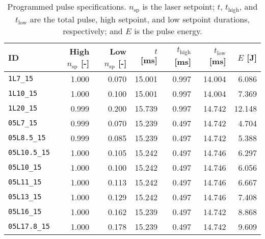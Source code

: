 \begin{table}[h]
\centering
\caption[Programmed pulse specifications]{Programmed pulse specifications. $n_\mathrm{sp}$ is the laser setpoint; $t$, $t_\mathrm{high}$, and $t_\mathrm{low}$ are the total pulse, high setpoint, and low setpoint durations, respectively; and $E$ is the pulse energy.}
\label{tab:app_pulseShapes}
\begin{tabular}{@{}lrrrrrr@{}}
\toprule
               ID & High $n_\mathrm{sp}$ [-] & Low $n_\mathrm{sp}$ [-] & $t$ [ms] & $t_\mathrm{high}$ [ms] & $t_\mathrm{low}$ [ms] & $E$ [J] \\
\midrule
    \verb|1L7_15| &                    1.000 &                   0.070 &   15.001 &                  0.997 &                14.004 &   6.086 \\
   \verb|1L10_15| &                    1.000 &                   0.100 &   15.001 &                  0.997 &                14.004 &   7.369 \\
   \verb|1L20_15| &                    0.999 &                   0.200 &   15.739 &                  0.997 &                14.742 &  12.148 \\
   \verb|05L7_15| &                    0.999 &                   0.070 &   15.239 &                  0.497 &                14.742 &   4.704 \\
 \verb|05L8.5_15| &                    0.999 &                   0.085 &   15.239 &                  0.497 &                14.742 &   5.388 \\
\verb|05L10.5_15| &                    1.000 &                   0.105 &   15.242 &                  0.497 &                14.746 &   6.297 \\
  \verb|05L10_15| &                    1.000 &                   0.100 &   15.242 &                  0.497 &                14.746 &   6.056 \\
  \verb|05L11_15| &                    1.000 &                   0.113 &   15.242 &                  0.497 &                14.746 &   6.667 \\
  \verb|05L13_15| &                    1.000 &                   0.129 &   15.242 &                  0.497 &                14.746 &   7.408 \\
  \verb|05L16_15| &                    1.000 &                   0.162 &   15.239 &                  0.497 &                14.742 &   8.868 \\
\verb|05L17.8_15| &                    1.000 &                   0.178 &   15.239 &                  0.497 &                14.742 &   9.609 \\

\end{tabular}
\end{table}
